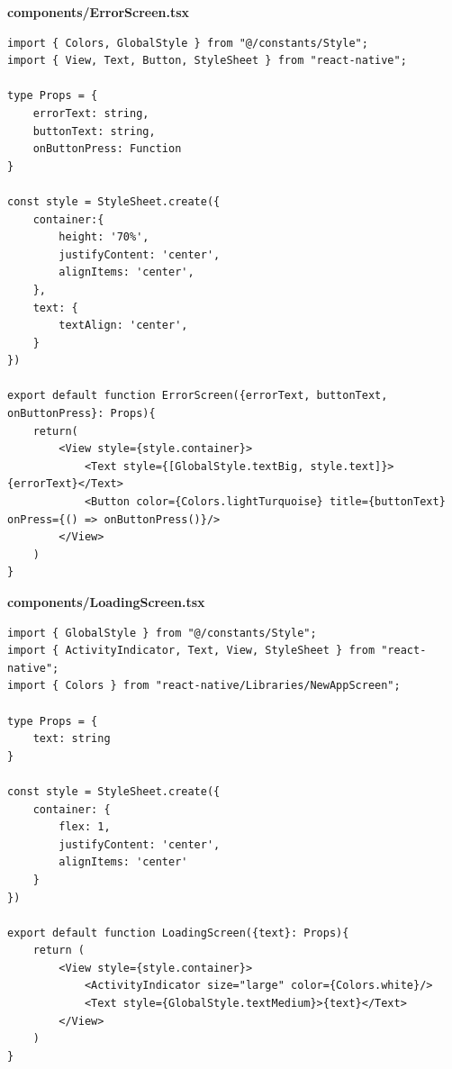 \documentclass[11pt, twoside]{article}
\begin{document}
\textbf{components/ErrorScreen.tsx}
\begin{lstlisting}
import { Colors, GlobalStyle } from "@/constants/Style";
import { View, Text, Button, StyleSheet } from "react-native";

type Props = {
    errorText: string,
    buttonText: string,
    onButtonPress: Function
}

const style = StyleSheet.create({
    container:{
        height: '70%',
        justifyContent: 'center',
        alignItems: 'center',
    },
    text: {
        textAlign: 'center',
    }
})

export default function ErrorScreen({errorText, buttonText, onButtonPress}: Props){
    return(
        <View style={style.container}>
            <Text style={[GlobalStyle.textBig, style.text]}>{errorText}</Text>
            <Button color={Colors.lightTurquoise} title={buttonText} onPress={() => onButtonPress()}/>
        </View>
    )
}
\end{lstlisting}

\textbf{components/LoadingScreen.tsx}
\begin{lstlisting}
import { GlobalStyle } from "@/constants/Style";
import { ActivityIndicator, Text, View, StyleSheet } from "react-native";
import { Colors } from "react-native/Libraries/NewAppScreen";

type Props = {
    text: string
}

const style = StyleSheet.create({
    container: {
        flex: 1,
        justifyContent: 'center',
        alignItems: 'center'
    }
})

export default function LoadingScreen({text}: Props){
    return (
        <View style={style.container}>
            <ActivityIndicator size="large" color={Colors.white}/>
            <Text style={GlobalStyle.textMedium}>{text}</Text>
        </View>
    )    
}
\end{lstlisting}
\end{document}
